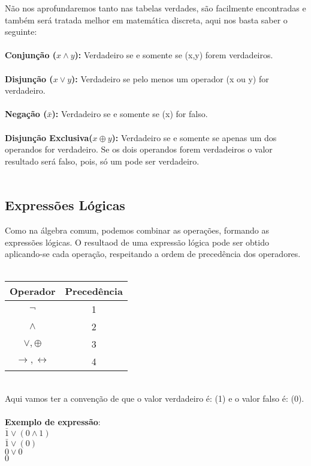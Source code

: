 \documentclass[12pt, onecolumn]{article}
\begin{document}
	Não nos aprofundaremos tanto nas tabelas verdades, são facilmente encontradas
	e também será tratada melhor em matemática discreta, aqui nos basta saber o
	seguinte: \\
	\\
	\textbf{Conjunção ($x \land y$):} Verdadeiro se e somente se (x,y) forem
	verdadeiros.\\
	\\
	\textbf{Disjunção ($x \lor y$):} Verdadeiro se pelo menos um operador (x ou y) 
	for verdadeiro.\\
	\\
	\textbf{Negação ($\bar{x}$):} Verdadeiro se e somente se (x) for falso.\\
	\\
	\textbf{Disjunção Exclusiva($x \oplus y$):} Verdadeiro se e somente se
	apenas um dos operandos for verdadeiro. Se os dois operandos forem verdadeiros
	o valor resultado será falso, pois, só um pode ser verdadeiro.\\
	\\

		\subsection{\centering Expressões Lógicas}
	
	Como na álgebra comum, podemos combinar as operações, formando as expressões
	lógicas. O resultaod de uma expressão lógica pode ser obtido aplicando-se 
	cada operação, respeitando a ordem de precedência dos operadores.\\
	\\
		\begin{table}[h]
			\centering
			\begin{tabular}{|c|c|}
				\hline
				Operador & Precedência\\ \hline

				$\lnot$ & 1 \\
				$\land$ & 2 \\
				$\lor, \oplus$ & 3 \\
				$\longrightarrow, \longleftrightarrow$ & 4 \\
				\hline
			\end{tabular}
		\end{table}
	\\
	Aqui vamos ter a convenção de que o valor verdadeiro é: (1) e o valor
	falso é: (0).\\
	\\
	\textbf{Exemplo de expressão}: 
	\\
	$\bar{1} \lor (0 \land 1)$\\
	$ \bar{1} \lor (0)$\\
	$0 \lor 0$\\
	$0$\\
	\\
\end{document}
